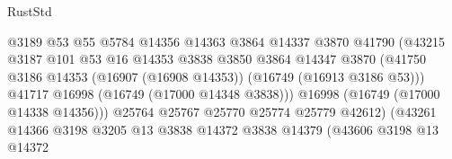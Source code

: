 \begin{lexlean}{RustStd}
\begin{coremodule}
                                            @3189
                                            @53
                                            @55
                                            @5784
                                            @14356
                                            @14363
                                            @3864
                                            @14337
                                            @3870
                                            @41790
                                            (@43215
                                              @3187
                                              @101
                                              @53
                                              @16
                                              @14353
                                              @3838
                                              @3850
                                              @3864
                                              @14347
                                              @3870
                                              (@41750
                                                @3186
                                                @14353
                                                (@16907 (@16908 @14353))
                                                (@16749 (@16913 @3186 @53)))
                                              @41717
                                              @16998
                                              (@16749 (@17000 @14348 @3838)))
                                            @16998
                                            (@16749 (@17000 @14338 @14356)))
                                          @25764
                                          @25767
                                          @25770
                                          @25774
                                          @25779
                                          @42612)
                                        (@43261
                                          @14366
                                          @3198
                                          @3205
                                          @13
                                          @3838
                                          @14372
                                          @3838
                                          @14379
                                          (@43606
                                            @3198
                                            @13
                                            @14372

\end{coremodule}
\end{lexlean}
